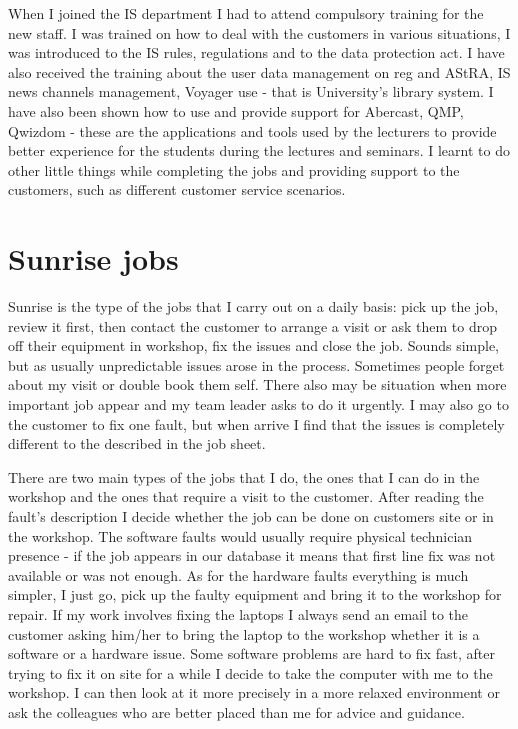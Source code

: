 \documentclass[10pt,a4paper,headinclude=true]{report}
\begin{document}
When I joined the IS department I had to attend compulsory training for the new staff. I was trained on how to deal with the customers in various situations, I was introduced to the IS rules, regulations and to the data protection act. I have also received the training about the user data management on reg and AStRA, IS news channels management, Voyager use - that is University's library system. I have also been shown how to use and provide support for Abercast, QMP, Qwizdom - these are the applications and tools used by the lecturers to provide better experience for the students during the lectures and seminars. I learnt to do other little things while completing the jobs and providing support to the customers, such as different customer service scenarios.

\section{Sunrise jobs}
Sunrise is the type of the jobs that I carry out on a daily basis: pick up the job, review it first, then contact the customer to arrange a visit or ask them to drop off their equipment in workshop, fix the issues and close the job. Sounds simple, but as usually unpredictable issues arose in the process. Sometimes people forget about my visit or double book them self. There also may be situation when more important job appear and my team leader asks to do it urgently. I may also go to the customer to fix one fault, but when arrive I find that the issues is completely different to the described in the job sheet.

There are two main types of the jobs that I do, the ones that I can do in the workshop and the ones that require a visit to the customer. After reading the fault's description I decide whether the job can be done on customers site or in the workshop. The software faults would usually require physical technician presence - if the job appears in our database it means that first line fix was not available or was not enough. As for the hardware faults everything is much simpler, I just go, pick up the faulty equipment and bring it to the workshop for repair. If my work involves fixing the laptops I always send an email to the customer asking him/her to bring the laptop to the workshop whether it is a software or a hardware issue. Some software problems are hard to fix fast, after trying to fix it on site for a while I decide to take the computer with me to the workshop. I can then look at it more precisely in a more relaxed environment or ask the colleagues who are better placed than me for advice and guidance.
\end{document}
